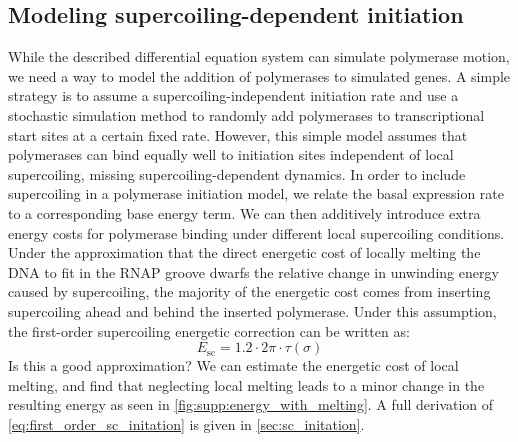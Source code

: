 \documentclass[11pt]{article}
\begin{document}
\subsection{Modeling supercoiling-dependent initiation}
While the described differential equation system can simulate polymerase motion, we need a way to model the addition of polymerases to simulated genes. A simple strategy is to assume a supercoiling-independent initiation rate and use a stochastic simulation method to randomly add polymerases to transcriptional start sites at a certain fixed rate. However, this simple model assumes that polymerases can bind equally well to initiation sites independent of local supercoiling, missing supercoiling-dependent dynamics. In order to include supercoiling in a polymerase initiation model, we relate the basal expression rate to a corresponding base energy term. We can then additively introduce extra energy costs for polymerase binding under different local supercoiling conditions. Under the approximation that the direct energetic cost of locally melting the DNA to fit in the RNAP groove dwarfs the relative change in unwinding energy caused by supercoiling, the majority of the energetic cost comes from inserting supercoiling ahead and behind the inserted polymerase. Under this assumption, the first-order supercoiling energetic correction can be written as:
\begin{equation}
    E_\text{sc} = 1.2  \cdot 2\pi \cdot \tau(\sigma)
\label{eq:first_order_sc_initation}
\end{equation}
 Is this a good approximation? We can estimate the energetic cost of local melting, and find that neglecting local melting leads to a minor change in the resulting energy as seen in \cref{fig:supp:energy_with_melting}. A full derivation of \cref{eq:first_order_sc_initation} is given in \cref{sec:sc_initation}.
\end{document}
